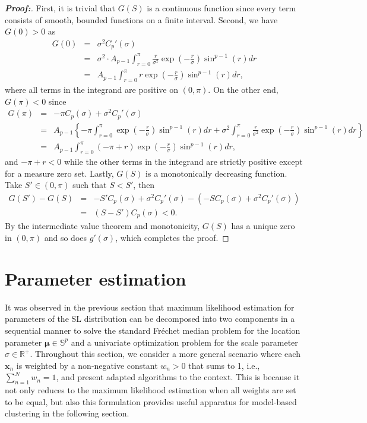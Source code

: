 \documentclass[10pt]{article}
\newcommand{\bfx}{\mathbf{x}}
\newcommand{\bfmu}{\boldsymbol{\mu}}
\newcommand{\bbS}{\mathbb{S}}
\newcommand{\bbRpos}{\mathbb{R}^+}
\newcommand{\Frechet}{Fr\'{e}chet }
\begin{document}
\begin{proof}[\textbf{\upshape Proof:}]
	First, it is trivial that $G(S)$ is a continuous function since every term consists of smooth, bounded functions on a finite interval. Second, we have $G(0) > 0$ as
	\begin{eqnarray*}
		G(0) &=& \sigma^2 C_p'(\sigma) \\
		&=& \sigma^2 \cdot  A_{p-1} \int_{r=0}^\pi \frac{r}{\sigma^2} \exp \left( -\frac{r}{\sigma}\right) \sin^{p-1}(r)dr \\
		&=& A_{p-1} \int_{r=0}^\pi r \exp  \left( -\frac{r}{\sigma}\right) \sin^{p-1}(r)dr,
	\end{eqnarray*}
	where all terms in the integrand are positive on $(0,\pi)$. On the other end, $G(\pi) < 0$ since  
	\begin{eqnarray*}
		G(\pi) &=& -\pi C_p(\sigma) + \sigma^2 C_p'(\sigma)\\
		&=& A_{p-1} \left\lbrace  -\pi \int_{r=0}^\pi \exp \left(-\frac{r}{\sigma}\right)\sin^{p-1}(r)dr + \sigma^2 \int_{r=0}^\pi \frac{r}{\sigma^2}\exp \left( -\frac{r}{\sigma}\right) \sin^{p-1}(r)dr \right\rbrace \\
		&=& A_{p-1} \int_{r=0}^\pi (-\pi + r) \exp \left( -\frac{r}{\sigma}\right) \sin^{p-1}(r)dr ,
	\end{eqnarray*}
	and $-\pi+r < 0$ while the other terms in the integrand are strictly positive except for a measure zero set. Lastly, $G(S)$ is a monotonically decreasing function. Take $S' \in (0,\pi)$ such that $S < S'$, then 
	\begin{eqnarray*}
		G(S')-G(S) &=& -S' C_p (\sigma) + \sigma^2 C_p'(\sigma) - ( -S C_p (\sigma) + \sigma^2 C_p'(\sigma) ) \\
		&=& (S - S') C_p(\sigma) < 0.
	\end{eqnarray*}
	By the intermediate value theorem and monotonicity, $G(S)$ has a unique zero in $(0,\pi)$ and so does $g'(\sigma)$, which completes the proof. 
\end{proof}


\section{Parameter estimation}\label{sec4:parameter}

It was observed in the previous section that maximum likelihood estimation for parameters of the SL distribution can be decomposed into two components in a sequential manner to solve the standard \Frechet median problem for the location parameter $\bfmu \in \bbS^p$ and a univariate optimization problem for the scale parameter $\sigma \in \bbRpos$. Throughout this section, we consider a more general scenario where each $\bfx_n$ is weighted by a non-negative constant $w_n > 0$ that sums to 1, i.e., $\sum_{n=1}^N w_n = 1$, and present adapted algorithms to the context. This is because it not only reduces to the maximum likelihood estimation when all weights are set to be equal, but also this formulation provides useful apparatus for model-based clustering in the following section. 
\end{document}
